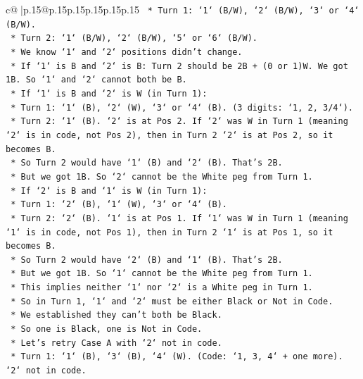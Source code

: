 \documentclass{article}
\begin{document}
{\begin{supertabular}{c@{$\;$}|p{.15\linewidth}@{}p{.15\linewidth}p{.15\linewidth}p{.15\linewidth}p{.15\linewidth}p{.15\linewidth}}
{{{\texttt{            *   Turn 1: `1` (B/W), `2` (B/W), `3` or `4` (B/W).} \\
\texttt{            *   Turn 2: `1` (B/W), `2` (B/W), `5` or `6` (B/W).} \\
\texttt{            *   We know `1` and `2` positions didn't change.} \\
\texttt{            *   If `1` is B and `2` is B: Turn 2 should be 2B + (0 or 1)W. We got 1B. So `1` and `2` cannot both be B.} \\
\texttt{            *   If `1` is B and `2` is W (in Turn 1):} \\
\texttt{                *   Turn 1: `1` (B), `2` (W), `3` or `4` (B). (3 digits: `1, 2, 3/4`).} \\
\texttt{                *   Turn 2: `1` (B). `2` is at Pos 2. If `2` was W in Turn 1 (meaning `2` is in code, not Pos 2), then in Turn 2 `2` is at Pos 2, so it becomes B.} \\
\texttt{                *   So Turn 2 would have `1` (B) and `2` (B). That's 2B.} \\
\texttt{                *   But we got 1B. So `2` cannot be the White peg from Turn 1.} \\
\texttt{            *   If `2` is B and `1` is W (in Turn 1):} \\
\texttt{                *   Turn 1: `2` (B), `1` (W), `3` or `4` (B).} \\
\texttt{                *   Turn 2: `2` (B). `1` is at Pos 1. If `1` was W in Turn 1 (meaning `1` is in code, not Pos 1), then in Turn 2 `1` is at Pos 1, so it becomes B.} \\
\texttt{                *   So Turn 2 would have `2` (B) and `1` (B). That's 2B.} \\
\texttt{                *   But we got 1B. So `1` cannot be the White peg from Turn 1.} \\
\texttt{            *   This implies neither `1` nor `2` is a White peg in Turn 1.} \\
\texttt{            *   So in Turn 1, `1` and `2` must be either Black or Not in Code.} \\
\texttt{            *   We established they can't both be Black.} \\
\texttt{            *   So one is Black, one is Not in Code.} \\
\texttt{            *   Let's retry Case A with `2` not in code.} \\
\texttt{                *   Turn 1: `1` (B), `3` (B), `4` (W). (Code: `1, 3, 4` + one more). `2` not in code.} \\
}}}
\end{supertabular}}
\end{document}
